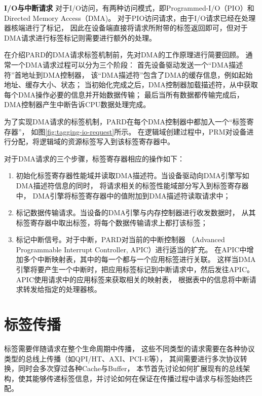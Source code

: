 \textbf{I/O与中断请求}\quad
对于I/O访问，有两种访问模式，即Programmed-I/O（PIO）和Directed Memory Access（DMA)。
对于PIO访问请求，由于I/O请求已经在处理器核端进行了标记，
因此在设备端直接将请求所附带的标签返回即可，但对于DMA请求进行标签标记则需要进行额外的处理。

在介绍PARD的DMA请求标签机制前，先对DMA的工作原理进行简要回顾。
通常一个DMA请求过程可以分为三个阶段：
首先设备驱动发送一个``DMA描述符''首地址到DMA控制器，
该``DMA描述符''包含了DMA的缓存信息，例如起始地址、缓存大小、状态；
当初始化完成之后，DMA控制器加载描述符，从中获取每个DMA操作必要的信息并开始数据传输；
最后当所有数据都传输完成后，DMA控制器产生中断告诉CPU数据处理完成。

为了实现DMA请求的标签机制，PARD在每个DMA控制器中都加入一个``标签寄存器''，
如图\ref{fig:tagging-io-request}所示。
在逻辑域创建过程中，PRM对设备进行分配，将逻辑域的资源标签写入到该标签寄存器中。

对于DMA请求的三个步骤，标签寄存器相应的操作如下：

\begin{enumerate}[leftmargin=2\parindent, nolistsep, label=\arabic*）]
  \item 初始化标签寄存器性能域并读取DMA描述符。当设备驱动向DMA引擎写如DMA描述符信息的同时，
        将请求相关的标签性能域部分写入到标签寄存器中，
        DMA引擎将标签寄存器中的值附加到DMA描述符读取请求中；
  \item 标记数据传输请求。当设备的DMA引擎与内存控制器进行收发数据时，
        从其标签寄存器中取出标签，将每个数据传输请求上都打该标签；
  \item 标记中断信号。对于中断，PARD对当前的中断控制器
        （Advanced Programmable Interrupt Controller, APIC）进行适当的扩充。
        在APIC中增加多个中断映射表，其中的每一个都与一个应用标签进行关联。
        这样当DMA引擎将要产生一个中断时，把应用标签标记到中断请求中，然后发往APIC。
        APIC使用请求中的应用标签来获取相关的映射表，
        根据表中的信息将中断请求转发给指定的处理器核。
\end{enumerate}



\section{标签传播}
\label{chap:labeladdrspace:propagation}

标签需要伴随请求在整个生命周期中传播，
这些不同类型的请求需要在各种协议类型的总线上传播（如QPI/HT、AXI、PCI-E等），
其间需要进行多次协议转换，同时会多次穿过各种Cache与Buffer，
本节首先讨论如何扩展现有的总线架构，使其能够传递标签信息，并讨论如何在保证在传播过程中请求与标签始终匹配。

